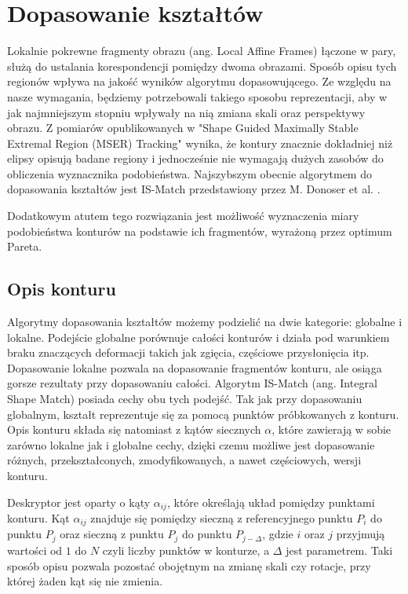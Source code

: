 \chapter{Dopasowanie kształtów}

Lokalnie pokrewne fragmenty obrazu (ang. Local Affine Frames) łączone w pary,
służą do ustalania korespondencji pomiędzy dwoma obrazami. Sposób opisu tych
regionów wpływa na jakość wyników algorytmu dopasowującego. Ze względu na nasze
wymagania, będziemy potrzebowali takiego sposobu reprezentacji, aby w jak
najmniejszym stopniu wpływały na nią zmiana skali oraz perspektywy obrazu. Z
pomiarów opublikowanych w "Shape Guided Maximally Stable Extremal
Region (MSER) Tracking" \cite{mser_tracking} wynika, że kontury znacznie
dokładniej niż elipsy opisują badane regiony i jednocześnie nie wymagają dużych
zasobów do obliczenia wyznacznika podobieństwa. Najszybszym obecnie algorytmem
do dopasowania kształtów jest IS-Match przedstawiony przez M. Donoser et al.
\cite{ismatch}.

Dodatkowym atutem tego rozwiązania jest możliwość wyznaczenia miary
podobieństwa konturów na podstawie ich fragmentów, wyrażoną przez optimum
Pareta.

\section{Opis konturu}

Algorytmy dopasowania kształtów możemy podzielić na dwie kategorie: globalne i
lokalne. Podejście globalne porównuje całości konturów i działa pod warunkiem
braku znaczących deformacji takich jak zgięcia, częściowe przysłonięcia itp.
Dopasowanie lokalne pozwala na dopasowanie fragmentów konturu, ale osiąga
gorsze rezultaty przy dopasowaniu całości. Algorytm IS-Match (ang. Integral
Shape Match) posiada cechy obu tych podejść. Tak jak przy dopasowaniu
globalnym, kształt reprezentuje się za pomocą punktów próbkowanych z konturu.
Opis konturu składa się natomiast z kątów siecznych $\alpha$, które zawierają w sobie
zarówno lokalne jak i globalne cechy, dzięki czemu możliwe jest dopasowanie
różnych, przekształconych, zmodyfikowanych, a nawet częściowych, wersji
konturu.

Deskryptor jest oparty o kąty $\alpha_{ij}$, które określają układ pomiędzy
punktami konturu. Kąt $\alpha_{ij}$ znajduje się pomiędzy sieczną z
referencyjnego punktu $P_{i}$ do punktu $P_{j}$ oraz sieczną z punktu $P_{j}$
do punktu $P_{j-\Delta}$, gdzie $i$ oraz $j$ przyjmują wartości od $1$ do $N$
czyli liczby punktów w konturze, a $\Delta$ jest parametrem. Taki sposób opisu
pozwala pozostać obojętnym na zmianę skali czy rotacje, przy której żaden kąt
się nie zmienia.


